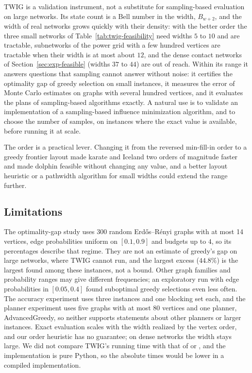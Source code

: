 \documentclass[11pt]{article}
\theoremstyle{definition}
\theoremstyle{remark}
\begin{document}
TWIG is a validation instrument, not a substitute for sampling-based evaluation on large networks. Its state count is a Bell number in the width, $B_{w+2}$, and the width of real networks grows quickly with their density: with the better order the three small networks of Table~\ref{tab:twig-feasibility} need widths $5$ to $10$ and are tractable, subnetworks of the power grid with a few hundred vertices are tractable when their width is at most about $12$, and the dense contact networks of Section~\ref{sec:exp-feasible} (widths $37$ to $44$) are out of reach. Within its range it answers questions that sampling cannot answer without noise: it certifies the optimality gap of greedy selection on small instances, it measures the error of Monte Carlo estimates on graphs with several hundred vertices, and it evaluates the plans of sampling-based algorithms exactly. A natural use is to validate an implementation of a sampling-based influence minimization algorithm, and to choose the number of samples, on instances where the exact value is available, before running it at scale.

The order is a practical lever. Changing it from the reversed min-fill-in order to a greedy frontier layout made karate and Iceland two orders of magnitude faster and made dolphin feasible without changing any value, and a better layout heuristic or a pathwidth algorithm for small widths could extend the range further.

\subsection{Limitations}\label{sec:conclusion}

The optimality-gap study uses 300 random Erd\H{o}s--R\'enyi graphs with at most 14 vertices, edge probabilities uniform on $[0.1,0.9]$ and budgets up to $4$, so its percentages describe that regime. They are not an estimate of greedy's gap on large networks, where TWIG cannot run, and the largest excess ($44.8\%$) is the largest found among these instances, not a bound. Other graph families and probability ranges may give different frequencies; an exploratory run with edge probabilities in $[0.05,0.4]$ found suboptimal greedy selections even less often. The accuracy experiment uses three instances and one blocking set each, and the planner experiment uses five graphs with at most $80$ vertices and one planner, AdvancedGreedy, so neither supports statements about other planners or larger instances. Exact evaluation scales with the width realized by the vertex order, and our order heuristic has no guarantee; on dense networks the width stays large. We did not compare TWIG's running time with that of \citet{nakamura2026} or \citet{pozar2026}, and the implementation is pure Python, so the absolute times would be lower in a compiled implementation.
\end{document}
